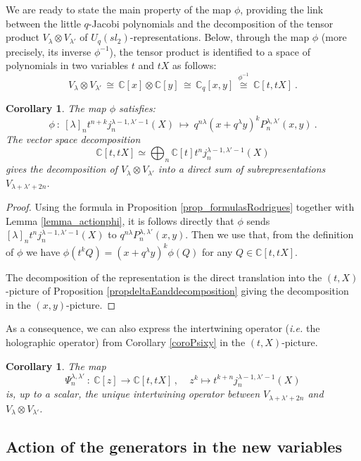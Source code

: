 \documentclass[a4paper,12pt]{article}
\numberwithin{equation}{section}
\newcommand{\C}{\mathbb{C}}
\newtheorem{coro}[theo]{Corollary}
\theoremstyle{rem}
\theoremstyle{definition}
\begin{document}
We are ready to state the main property of the map $\phi$, providing the link between the little $q$-Jacobi polynomials and the decomposition of the tensor product $V_{\lambda}\otimes V_{\lambda'}$ of $U_q(sl_2)$-representations. Below, through the map $\phi$ (more precisely, its inverse $\phi^{-1}$), the tensor product is identified to a space of polynomials in two variables $t$ and $tX$ as follows:
\[V_{\lambda}\otimes V_{\lambda'}\,\cong\, \C[x]\otimes\C[y]\,\cong\,\C_q[x,y]\,\stackrel{\phi^{-1}}{\cong}\,\C[t,tX]\ .\]
\begin{coro}\label{coro_phi}
The map $\phi$ satisfies:
\[\phi\ :\ [\lambda]_n t^{n+k}j^{\lambda-1,\lambda'-1}_n(X)\ \mapsto\ q^{n\lambda}(x+q^\lambda y)^kP_n^{\lambda,\lambda'}(x,y)\ .\]
The vector space decomposition 
\[\C[t,tX]\simeq \bigoplus_n \C[t] t^nj^{\lambda-1,\lambda'-1}_n(X) \]
gives the decomposition of $V_\lambda\otimes V_{\lambda'}$ into a direct sum of subrepresentations $V_{\lambda+\lambda'+2n}$.
\end{coro}
\begin{proof}
Using the formula in Proposition \ref{prop_formulasRodrigues} together with Lemma \ref{lemma_actionphi}, it is follows directly that $\phi$ sends $[\lambda]_n t^{n}j^{\lambda-1,\lambda'-1}_n(X)$ to $q^{n\lambda}P_n^{\lambda,\lambda'}(x,y)$. Then we use that, from the definition of $\phi$ we have $\phi(t^kQ)=(x+q^{\lambda}y)^k\phi(Q)$ for any $Q\in\C[t,tX]$.

The decomposition of the representation is the direct translation into the $(t,X)$-picture of Proposition \ref{propdeltaEanddecomposition} giving the decomposition in the $(x,y)$-picture.
\end{proof}

As a consequence, we can also express the intertwining operator (\emph{i.e.} the holographic operator) from Corollary \ref{coroPsixy} in the $(t,X)$-picture.
\begin{coro}\label{coroPsitX}
The map 
\[ \Psi_n^{\lambda,\lambda'}\ :\ \C[z]\to \C[t,tX]\,,\ \ \ \ \ z^k\mapsto t^{k+n}j^{\lambda-1,\lambda'-1}_n(X)\]
is, up to a scalar, the unique intertwining operator between $V_{\lambda+\lambda'+2n}$ and $V_\lambda\otimes V_{\lambda'}$. 
\end{coro}

\subsection{Action of the generators in the new variables}
\end{document}
